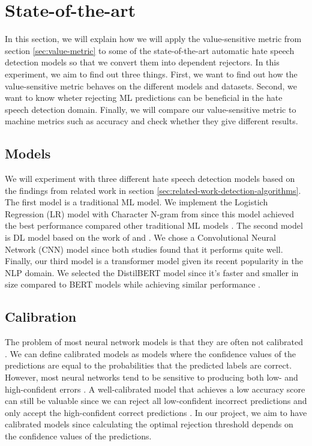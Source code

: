 \section{State-of-the-art}
\label{sec:state-of-the-art}
In this section, we will explain how we will apply the value-sensitive metric from section \ref{sec:value-metric} to some of the state-of-the-art automatic hate speech detection models so that we convert them into dependent rejectors.
%
In this experiment, we aim to find out three things.
%
First, we want to find out how the value-sensitive metric behaves on the different models and datasets.
%
Second, we want to know wheter rejecting ML predictions can be beneficial in the hate speech detection domain.
%
Finally, we will compare our value-sensitive metric to machine metrics such as accuracy and check whether they give different results.
%

\subsection{Models}
We will experiment with three different hate speech detection models based on the findings from related work in section \ref{sec:related-work-detection-algorithms}.
%
The first model is a traditional ML model.
%
We implement the Logistich Regression (LR) model with Character N-gram from \citet{waseem2016hateful} since this model achieved the best performance compared other traditional ML models \citet{davidson2017automated}.
%
The second model is DL model based on the work of \citet{agrawal2018deep} and \citet{badjatiya2017deep}.
%
We chose a Convolutional Neural Network (CNN) model since both studies found that it performs quite well.
%
Finally, our third model is a transformer model given its recent popularity in the NLP domain.
%
We selected the DistilBERT model since it's faster and smaller in size compared to BERT models while achieving similar performance \citep{sanh2019distilbert}.

\subsection{Calibration}
The problem of most neural network models is that they are often not calibrated \citep{guo2017calibration,sayin2021science}.
%
We can define calibrated models as models where the confidence values of the predictions are equal to the probabilities that the predicted labels are correct.
%
However, most neural networks tend to be sensitive to producing both low- and high-confident errors \citep{guo2017calibration, sayin2021science}.
%
A well-calibrated model that achieves a low accuracy score can still be valuable since we can reject all low-confident incorrect predictions and only accept the high-confident correct predictions \citep{sayin2021science}.
%
In our project, we aim to have calibrated models since calculating the optimal rejection threshold depends on the confidence values of the predictions.
%

